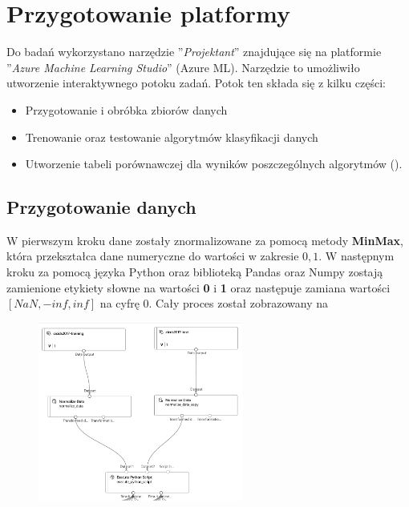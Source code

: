 \section{Przygotowanie platformy}
Do badań wykorzystano narzędzie ''\textit{Projektant}'' znajdujące się na platformie ''\textit{Azure Machine Learning Studio}'' (Azure ML). Narzędzie to umożliwiło utworzenie interaktywnego potoku zadań. Potok ten składa się z kilku części:
\begin{itemize}
    \item Przygotowanie i obróbka zbiorów danych
    \item Trenowanie oraz testowanie algorytmów klasyfikacji danych
    \item Utworzenie tabeli porównawczej dla wyników poszczególnych algorytmów ().
\end{itemize}

\subsection{Przygotowanie danych}
W pierwszym kroku dane zostały znormalizowane za pomocą metody \textbf{MinMax}, która przekształca dane numeryczne do wartości w zakresie ${0, 1}$. W następnym kroku za pomocą języka Python oraz biblioteką Pandas oraz Numpy zostają zamienione etykiety słowne na wartości \textbf{0} i \textbf{1} oraz następuje zamiana wartości $[NaN, -inf, inf]$ na cyfrę $0$. Cały proces został zobrazowany na 

\begin{figure}[H]
    \centering
    \includegraphics[width=0.6\textwidth]{images/norm}
    \label{fig:norm}
\end{figure}

